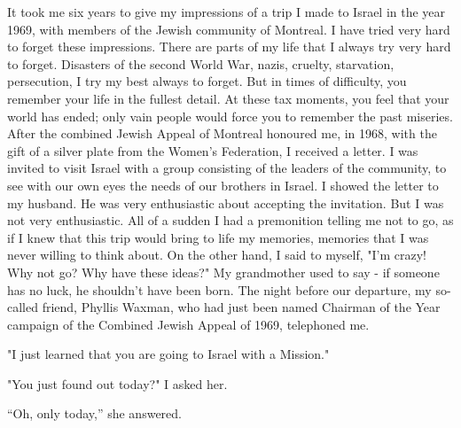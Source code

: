 
It took me six years to give my impressions of a trip I made  to Israel in the year 1969, with members of the Jewish community of Montreal.
I have tried very hard to forget these impressions. 
There are parts of my life that I always try very hard to forget. 
Disasters of the second World War, nazis, cruelty, starvation, persecution, I try my best always to forget. But in times of difficulty, you remember your life in the fullest detail.
At these tax moments, you feel that your world has ended; only vain people would force you to remember the past miseries. 
After the combined Jewish Appeal of Montreal honoured me, in 1968, with the gift of a silver plate from the Women's Federation, I received a letter. I was invited to visit Israel with a group consisting of the leaders of the community, to see with our own eyes the needs of our brothers in Israel.
I showed the letter to my husband. He was very enthusiastic about accepting the invitation.
But I was not very enthusiastic. All of a sudden I had a premonition telling me not to go, as if I knew that this trip would bring to life my memories, memories that I was never willing to think about.
On the other hand, I said to myself, "I'm crazy! Why not go? Why have these ideas?"
My grandmother used to say  - if someone has no luck, he shouldn't have been born. 
The night before our departure, my so-called friend, Phyllis Waxman, who had just been named Chairman of the Year campaign of the Combined Jewish Appeal of 1969, telephoned me. 

"I just learned that you are going to Israel with a Mission." 

"You just found out today?" I asked her. 

“Oh, only today,” she answered.

